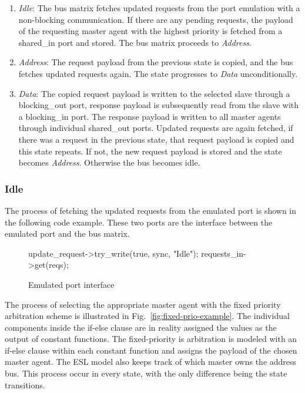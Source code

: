 \begin{enumerate}
 \item \textit{Idle}: The bus matrix fetches updated requests from the port emulation with a non-blocking communication. If there are any pending requests, the payload of the requesting master agent with the highest priority is fetched from a shared\_in port and stored. The bus matrix proceeds to \textit{Address}. 
 \item \textit{Address}: The request payload from the previous state is copied, and the bus fetches updated requests again. The state progresses to \textit{Data} unconditionally.
 \item \textit{Data}: The copied request payload is written to the selected slave through a blocking\_out port, response payload is subsequently read from the slave with a blocking\_in port. The response payload is written to all master agents through individual shared\_out ports. Updated requests are again fetched, if there was a request in the previous state, that request payload is copied and this state repeats. If not, the new request payload is stored and the state becomes \textit{Address}. Otherwise the bus becomes idle.    
\end{enumerate}

\subsubsection{Idle}
The process of fetching the updated requests from the emulated port is shown in the following code example. These two ports are the interface between the emulated port and the bus matrix.
\begin{figure}[h!]
\begin{C++}
update_request->try_write(true, sync, "Idle");
requests_in->get(reqs);
\end{C++}
\caption{Emulated port interface}
\end{figure}

The process of selecting the appropriate master agent with the fixed priority arbitration scheme is illustrated in Fig.~\ref{fig:fixed-prio-example}. The individual components inside the if-else clause are in reality assigned the values as the output of constant functions. The fixed-priority is arbitration is modeled with an if-else clause within each constant function and assigns the payload of the chosen master agent. The ESL model also keeps track of which master owns the address bus. This process occur in every state, with the only difference being the state transitions. 
\newpage

